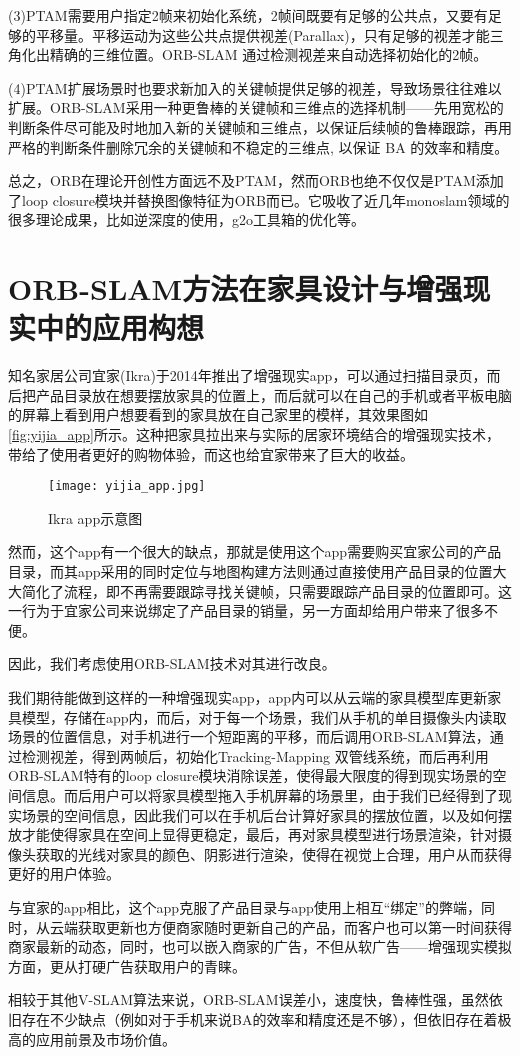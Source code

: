(3)PTAM需要用户指定2帧来初始化系统，2帧间既要有足够的公共点，又要有足够的平移量。平移运动为这些公共点提供视差(Parallax)，只有足够的视差才能三角化出精确的三维位置。ORB-SLAM 通过检测视差来自动选择初始化的2帧。

(4)PTAM扩展场景时也要求新加入的关键帧提供足够的视差，导致场景往往难以扩展。ORB-SLAM采用一种更鲁棒的关键帧和三维点的选择机制——先用宽松的判断条件尽可能及时地加入新的关键帧和三维点，以保证后续帧的鲁棒跟踪，再用严格的判断条件删除冗余的关键帧和不稳定的三维点, 以保证 BA 的效率和精度。

总之，ORB在理论开创性方面远不及PTAM，然而ORB也绝不仅仅是PTAM添加了loop closure模块并替换图像特征为ORB而已。它吸收了近几年monoslam领域的很多理论成果，比如逆深度的使用，g2o工具箱的优化等。
\section{ORB-SLAM方法在家具设计与增强现实中的应用构想}
知名家居公司宜家(Ikra)于2014年推出了增强现实app，可以通过扫描目录页，而后把产品目录放在想要摆放家具的位置上，而后就可以在自己的手机或者平板电脑的屏幕上看到用户想要看到的家具放在自己家里的模样，其效果图如\autoref*{fig:yijia_app}所示。这种把家具拉出来与实际的居家环境结合的增强现实技术，带给了使用者更好的购物体验，而这也给宜家带来了巨大的收益。

\begin{figure}[!htbp]
\centering
\texttt{[image: yijia\_app.jpg]}
\caption{Ikra app示意图}
\label{fig:yijia_app}
\end{figure}

然而，这个app有一个很大的缺点，那就是使用这个app需要购买宜家公司的产品目录，而其app采用的同时定位与地图构建方法则通过直接使用产品目录的位置大大简化了流程，即不再需要跟踪寻找关键帧，只需要跟踪产品目录的位置即可。这一行为于宜家公司来说绑定了产品目录的销量，另一方面却给用户带来了很多不便。

因此，我们考虑使用ORB-SLAM技术对其进行改良。

我们期待能做到这样的一种增强现实app，app内可以从云端的家具模型库更新家具模型，存储在app内，而后，对于每一个场景，我们从手机的单目摄像头内读取场景的位置信息，对手机进行一个短距离的平移，而后调用ORB-SLAM算法，通过检测视差，得到两帧后，初始化Tracking-Mapping 双管线系统，而后再利用ORB-SLAM特有的loop closure模块消除误差，使得最大限度的得到现实场景的空间信息。而后用户可以将家具模型拖入手机屏幕的场景里，由于我们已经得到了现实场景的空间信息，因此我们可以在手机后台计算好家具的摆放位置，以及如何摆放才能使得家具在空间上显得更稳定，最后，再对家具模型进行场景渲染，针对摄像头获取的光线对家具的颜色、阴影进行渲染，使得在视觉上合理，用户从而获得更好的用户体验。

与宜家的app相比，这个app克服了产品目录与app使用上相互“绑定”的弊端，同时，从云端获取更新也方便商家随时更新自己的产品，而客户也可以第一时间获得商家最新的动态，同时，也可以嵌入商家的广告，不但从软广告——增强现实模拟方面，更从打硬广告获取用户的青睐。

相较于其他V-SLAM算法来说，ORB-SLAM误差小，速度快，鲁棒性强，虽然依旧存在不少缺点（例如对于手机来说BA的效率和精度还是不够），但依旧存在着极高的应用前景及市场价值。

